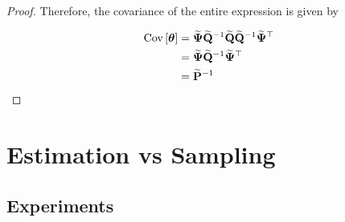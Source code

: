 \begin{proof}
Therefore, the covariance of the entire expression is given by 

\begin{align*}
    \text{Cov}\left[\boldsymbol{\theta}\right] &= \widetilde{\mathbf{\Psi}} \widetilde{\mathbf{Q}}^{-1} \widetilde{\mathbf{Q}} \widetilde{\mathbf{Q}}^{-1} \widetilde{\mathbf{\Psi}}^\top \\
    &= \widetilde{\mathbf{\Psi}} \widetilde{\mathbf{Q}}^{-1} \widetilde{\mathbf{\Psi}}^\top  \\
    &= \widetilde{\mathbf{P}}^{-1}
\end{align*}

\end{proof}



\section{Estimation vs Sampling}

\label{sec:comparison}

\subsection{Experiments}
